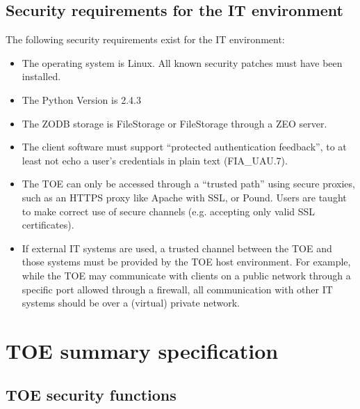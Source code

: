\documentclass[12pt,english]{scrbook}
\begin{document}



\section{Security requirements for the IT environment}

The following security requirements exist for the IT environment:

\begin{itemize}

  \item The operating system is Linux. All known security patches must have
    been installed.

  \item The Python Version is 2.4.3

  \item The ZODB storage is FileStorage or FileStorage through a ZEO server.

  \item The client software must support ``protected authentication feedback'',
      to at least not echo a user's credentials in plain text (FIA{\_}UAU.7).

  \item The TOE can only be accessed through a ``trusted path'' using secure
      proxies, such as an HTTPS proxy like Apache with SSL, or Pound. Users are
      taught to make correct use of secure channels (e.g. accepting only valid
      SSL certificates). 

  \item If external IT systems are used, a trusted channel between the TOE and
      those systems must be provided by the TOE host environment.  For example,
      while the TOE may communicate with clients on a public network through a
      specific port allowed through a firewall, all communication with other IT
      systems should be over a (virtual) private network.

\end{itemize}

\chapter{TOE summary specification}


\section{TOE security functions}  \label{toe-sec-funcs}
\end{document}
